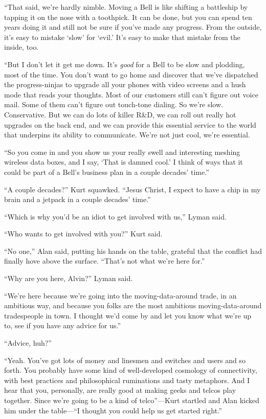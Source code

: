``That said, we're hardly nimble.  Moving a Bell is like shifting a
battleship by tapping it on the nose with a toothpick.  It can be
done, but you can spend ten years doing it and still not be sure if
you've made any progress.  From the outside, it's easy to mistake
`slow' for `evil.' It's easy to make that mistake from the inside,
too.

``But I don't let it get me down.  It's \textit{good} for a Bell to be
slow and plodding, most of the time.  You don't want to go home and
discover that we've dispatched the progress-ninjas to upgrade all your
phones with video screens and a hush mode that reads your thoughts. 
Most of our customers still can't figure out voice mail.  Some of them
can't figure out touch-tone dialing.  So we're slow.  Conservative. 
But we can do lots of killer R\&D, we can roll out really hot
upgrades on the back end, and we can provide this essential service to
the world that underpins its ability to communicate.  We're not just
cool, we're essential.

``So you come in and you show us your really swell and interesting
meshing wireless data boxes, and I say, `That is damned cool.' I think
of ways that it could be part of a Bell's business plan in a couple
decades' time.''

``A couple decades?'' Kurt squawked.  ``Jesus Christ, I expect to have
a chip in my brain and a jetpack in a couple decades' time.''

``Which is why you'd be an idiot to get involved with us,'' Lyman
said.

``Who wants to get involved with you?'' Kurt said.

``No one,'' Alan said, putting his hands on the table, grateful that
the conflict had finally hove above the surface.  ``That's not what
we're here for.''

``Why are you here, Alvin?'' Lyman said.

``We're here because we're going into the moving-data-around trade, in
an ambitious way, and because you folks are the most ambitious
moving-data-around tradespeople in town.  I thought we'd come by and
let you know what we're up to, see if you have any advice for us.''

``Advice, huh?''

``Yeah.  You've got lots of money and linesmen and switches and users
and so forth.  You probably have some kind of well-developed cosmology
of connectivity, with best practices and philosophical ruminations and
tasty metaphors.  And I hear that you, personally, are really good at
making geeks and telcos play together.  Since we're going to be a kind
of telco''---Kurt startled and Alan kicked him under the table---``I
thought you could help us get started right.''

